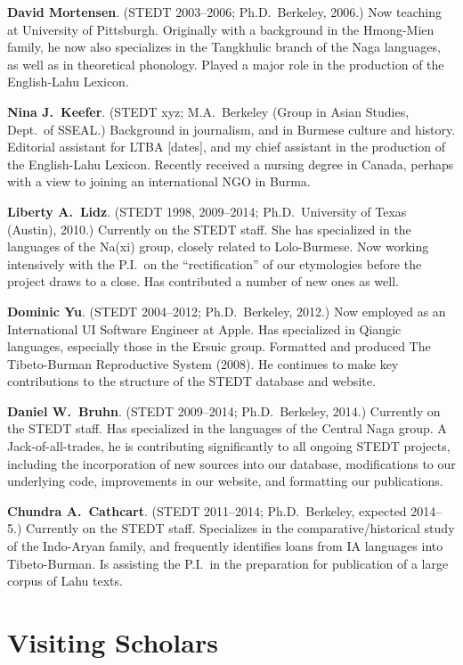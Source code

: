 \textbf{David Mortensen}. (STEDT 2003–2006; Ph.D.\ Berkeley, 2006.) Now teaching at University of Pittsburgh. Originally with a background in the Hmong-Mien family, he now also specializes in the Tangkhulic branch of the Naga languages, as well as in theoretical phonology. Played a major role in the production of the English-Lahu Lexicon.

\textbf{Nina J.\ Keefer}. (STEDT xyz; M.A.\ Berkeley (Group in Asian Studies, Dept.\ of SSEAL.) Background in journalism, and in Burmese culture and history. Editorial assistant for LTBA [dates], and my chief assistant in the production of the English-Lahu Lexicon. Recently received a nursing degree in Canada, perhaps with a view to joining an international NGO in Burma.

\textbf{Liberty A.\ Lidz}. (STEDT 1998, 2009–2014; Ph.D.\ University of Texas (Austin), 2010.) Currently on the STEDT staff. She has specialized in the languages of the Na(xi) group, closely related to Lolo-Burmese. Now working intensively with the P.I.\ on the “rectification” of our etymologies before the project draws to a close. Has contributed a number of new ones as well.

\textbf{Dominic Yu}. (STEDT 2004–2012; Ph.D.\ Berkeley, 2012.) Now employed as an International UI Software Engineer at Apple. Has specialized in Qiangic languages, especially those in the Ersuic group. Formatted and produced The Tibeto-Burman Reproductive System (2008). He continues to make key contributions to the structure of the STEDT database and website.

\textbf{Daniel W.\ Bruhn}. (STEDT 2009–2014; Ph.D.\ Berkeley, 2014.) Currently on the STEDT staff. Has specialized in the languages of the Central Naga group. A Jack-of-all-trades, he is contributing significantly to all ongoing STEDT projects, including the incorporation of new sources into our database, modifications to our underlying code, improvements in our website, and formatting our publications.

\textbf{Chundra A.\ Cathcart}. (STEDT 2011–2014; Ph.D.\ Berkeley, expected 2014–5.) Currently on the STEDT staff. Specializes in the comparative/historical study of the Indo-Aryan family, and frequently identifies loans from IA languages into Tibeto-Burman. Is assisting the P.I.\ in the preparation for publication of a large corpus of Lahu texts.

\section{Visiting Scholars}

